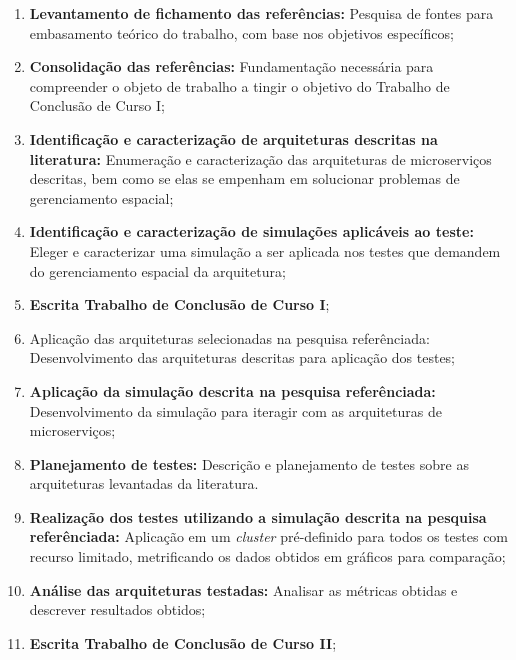 \begin{enumerate}
  \item \textbf{Levantamento de fichamento das referências:} Pesquisa de fontes para embasamento teórico do trabalho, com base nos objetivos específicos;

  \item \textbf{Consolidação das referências:} Fundamentação necessária para compreender o objeto de trabalho a tingir o objetivo do Trabalho de Conclusão de Curso I;

  \item \textbf{Identificação e caracterização de arquiteturas descritas na literatura:} Enumeração e caracterização das arquiteturas de microserviços descritas, bem como se elas se empenham em solucionar problemas de gerenciamento espacial;

  \item \textbf{Identificação e caracterização de simulações aplicáveis ao teste:} Eleger e caracterizar uma simulação a ser aplicada nos testes que demandem do gerenciamento espacial da arquitetura;

  \item \textbf{Escrita Trabalho de Conclusão de Curso I};

  \item Aplicação das arquiteturas selecionadas na pesquisa referênciada: Desenvolvimento das arquiteturas descritas para aplicação dos testes;

  \item \textbf{Aplicação da simulação descrita na pesquisa referênciada:} Desenvolvimento da simulação para iteragir com as arquiteturas de microserviços;

  \item \textbf{Planejamento de testes:} Descrição e planejamento de testes sobre as arquiteturas levantadas da literatura.

  \item \textbf{Realização dos testes utilizando a simulação descrita na pesquisa referênciada:} Aplicação em um \textit{cluster} pré-definido para todos os testes com recurso limitado, metrificando os dados obtidos em gráficos para comparação;

  \item \textbf{Análise das arquiteturas testadas:} Analisar as métricas obtidas e descrever resultados obtidos;

  \item \textbf{Escrita Trabalho de Conclusão de Curso II};
\end{enumerate}
